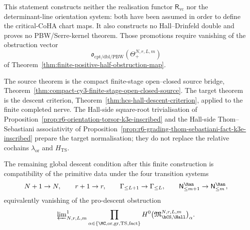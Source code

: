 \begin{theorem}
This statement constructs neither the realisation functor
$\mathsf R_{\mathrm{vc}}$ nor the determinant-line orientation system:
both have been assumed in order to define the critical-CoHA chart maps.
It also constructs no Hall--Drinfeld double and proves no
PBW/Serre-kernel theorem. Those promotions require vanishing of
the obstruction vector
\[
 \mathfrak o_{\mathrm{cpt/dbl/PBW}}(\Theta_{+}^{N,r,L,m})
\]
of Theorem~\ref{thm:finite-positive-half-obstruction-map}.

The source theorem is the compact finite-stage open--closed source
bridge, Theorem~\ref{thm:compact-cy3-finite-stage-open-closed-source}.
The target theorem is the descent criterion,
Theorem~\ref{thm:hcs-hall-descent-criterion}, applied to the finite
completed nerve. The Hall-side square-root trivialisation of
Proposition~\ref{prop:r6-orientation-torsor-k3e-inscribed} and the
Hall-side Thom--Sebastiani associativity of
Proposition~\ref{prop:r6-grading-thom-sebastiani-fact-k3e-inscribed}
prepare the target normalisation; they do not replace the relative
cochains $\lambda_{\mathrm{or}}$ and $H_{\mathrm{TS}}$.

The remaining global descent condition after this finite construction
is compatibility of the primitive data under the four transition
systems
\[
 N+1\to N,\qquad r+1\to r,\qquad
 \Gamma_{\leq L+1}\to\Gamma_{\leq L},\qquad
 \mathsf N_{\leq m+1}^{\Ran}\to\mathsf N_{\leq m}^{\Ran},
\]
equivalently vanishing of the pro-descent obstruction
\[
 \varprojlim\nolimits^1_{N,r,L,m}
 \prod_{\alpha\in\{\MC,\mathrm{or},\mathrm{gr},\mathrm{TS},\mathrm{fact}\}}
 H^0\bigl(
 \mathfrak M_{\hCS,\Hall}^{N,r,L,m}
 \bigr)_\alpha .
\]
\end{theorem}

